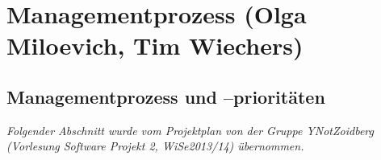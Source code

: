 \documentclass[fontsize=12pt,paper=a4,twoside]{scrartcl}
\begin{document}

\newpage
\section{Managementprozess (Olga Miloevich, Tim Wiechers)}\label{management}

\subsection{Managementprozess und --prioritäten}

\textit{Folgender Abschnitt wurde vom Projektplan von der Gruppe YNotZoidberg (Vorlesung Software Projekt 2, WiSe2013/14) übernommen.}\\
\end{document}
